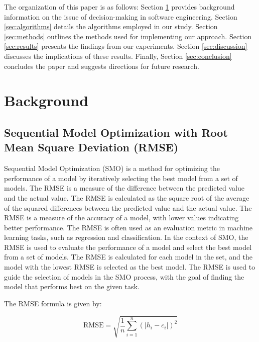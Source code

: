 \documentclass{ieeeaccess}
\begin{document}
  The organization of this paper is as follows: Section \ref{sec:background} provides background information on the issue of decision-making in software engineering. Section \ref{sec:algorithms} details the algorithms employed in our study. Section \ref{sec:methods} outlines the methods used for implementing our approach. Section \ref{sec:results} presents the findings from our experiments. Section \ref{sec:discussion} discusses the implications of these results. Finally, Section \ref{sec:conclusion} concludes the paper and suggests directions for future research.

\section{Background}
\label{sec:background}
\subsection{Sequential Model Optimization with Root Mean Square Deviation (RMSE)}
Sequential Model Optimization (SMO) is a method for optimizing the performance of a model by iteratively selecting the best model from a set of models. The RMSE is a measure of the difference between the predicted value and the actual value. The RMSE is calculated as the square root of the average of the squared differences between the predicted value and the actual value. The RMSE is a measure of the accuracy of a model, with lower values indicating better performance. The RMSE is often used as an evaluation metric in machine learning tasks, such as regression and classification. In the context of SMO, the RMSE is used to evaluate the performance of a model and select the best model from a set of models. The RMSE is calculated for each model in the set, and the model with the lowest RMSE is selected as the best model. The RMSE is used to guide the selection of models in the SMO process, with the goal of finding the model that performs best on the given task.

The RMSE formula is given by:

\begin{equation}
    \text{RMSE} = \sqrt{\frac{1}{n} \sum_{i=1}^n ( \lvert h_i - c_i \rvert)^2}
\end{equation}
\end{document}
